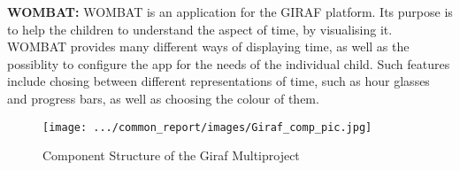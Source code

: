 \textbf{WOMBAT:} WOMBAT is an application for the GIRAF platform. Its purpose is to help the children to understand the aspect of time, by visualising it. WOMBAT provides many different ways of displaying time, as well as the possiblity to configure the app for the needs of the individual child. Such features include chosing between different representations of time, such as hour glasses and progress bars, as well as choosing the colour of them.\newline

\begin{figure}
	\centering
		\texttt{[image: .../common\_report/images/Giraf\_comp\_pic.jpg]}
	\caption{Component Structure of the Giraf Multiproject}
	\label{fig:Giraf_comp_pic}
\end{figure}
